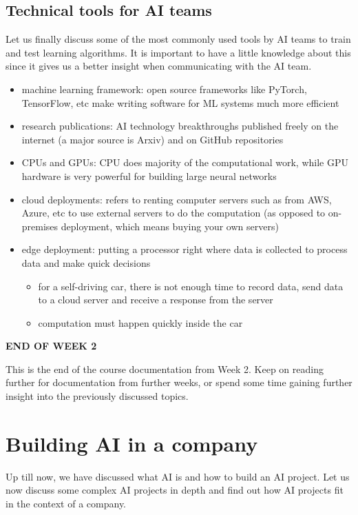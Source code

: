 \documentclass{article}[a4paper,12pt]
\theoremstyle{definition}
\begin{document}
\subsection{Technical tools for AI teams}
Let us finally discuss some of the most commonly used tools by AI teams to train and test learning algorithms. It is important to have a little knowledge about this since it gives us a better insight when communicating with the AI team.
\begin{itemize}
	\item machine learning framework: open source frameworks like PyTorch, TensorFlow, etc make writing software for ML systems much more efficient
	\item research publications: AI technology breakthroughs published freely on the internet (a major source is Arxiv) and on GitHub repositories
	\item CPUs and GPUs: CPU does majority of the computational work, while GPU hardware is very powerful for building large neural networks
	\item cloud deployments: refers to renting computer servers such as from AWS, Azure, etc to use external servers to do the computation (as opposed to on-premises deployment, which means buying your own servers)
	\item edge deployment: putting a processor right where data is collected to process data and make quick decisions
	\begin{itemize}
		\item for a self-driving car, there is not enough time to record data, send data to a cloud server and receive a response from the server
		\item computation must happen quickly inside the car
	\end{itemize}
\end{itemize}
\hrulefill
\begin{center}
\textbf{END OF WEEK 2}
\end{center}
This is the end of the course documentation from Week 2. Keep on reading further for documentation from further weeks, or spend some time gaining further insight into the previously discussed topics.

\hrulefill
\pagebreak
\section{Building AI in a company}
Up till now, we have discussed what AI is and how to build an AI project. Let us now discuss some complex AI projects in depth and find out how AI projects fit in the context of a company.
\end{document}
